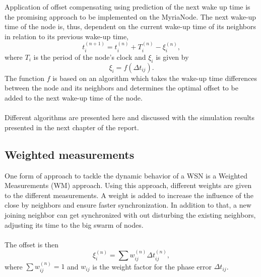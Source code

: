 \documentclass[a4paper,10pt]{report}
\begin{document}
Application of offset compensating using prediction of the next wake up time is the promising approach to be implemented on the MyriaNode. The next wake-up time of the node is, thus, dependent on the current wake-up time of its neighbors in relation to its previous wake-up time,
\begin{equation}
t_i^{(n+1)} = t_i^{(n)} + T_i^{(n)} - \xi_i^{(n)} ,
\end{equation}
where $T_i$ is the period of the node's clock and $\xi_i$ is given by
\begin{equation}
\xi_i = f(\Delta t_{ij}).
\end{equation}
The function $f$ is based on an algorithm which takes the wake-up time differences between the node and its neighbors and determines
the optimal offset to be added to the next wake-up time of the node.
\paragraph*{} Different algorithms are presented here and discussed with the simulation results presented in the next chapter of the report.
\subsection{\textbf{Weighted measurements}}
One form of approach to tackle the dynamic behavior of a WSN is a Weighted Measurements (WM) approach. Using this approach, different weights are given to the different measurements. A weight is added to
increase the influence of the close by neighbors and ensure faster synchronization. In addition to that, a new joining neighbor
can get synchronized with out disturbing the existing neighbors, adjusting its time to the big swarm of nodes. \paragraph*{}
The offset is then 
\begin{equation}
\xi_i^{(n)} = \sum{w_{ij}^{(n)}\Delta t_{ij}^{(n)}} ,
\end{equation}
where $\sum{w_{ij}^{(n)}= 1}$ and $w_{ij}$ is the weight factor for the phase error $\Delta t_{ij}$.
\end{document}
